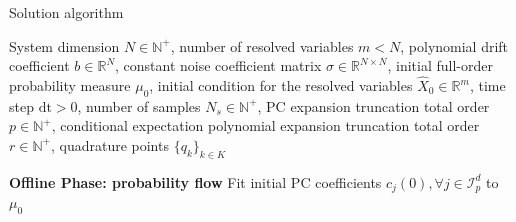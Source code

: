 \documentclass[11pt, a4paper, oneside, reqno]{amsart}
\makeatletter
\def\subsection{\@startsection{subsection}{2}%
	\z@{.5\linespacing\@plus.7\linespacing}{.5\linespacing}%
	{\normalfont\large\bfseries}}
\makeatother
\begin{document}
\subsection{Solution algorithm}
\begin{algorithm}[H]
\caption{Surrogate trajectories along probability flows}
\label{alg:solution algo}
\begin{algorithmic}[1]
\Require System dimension $N\in\mathbb{N}^+$, number of resolved variables $m<N$, polynomial drift coefficient $b\in\mathbb{R}^N$, constant noise coefficient matrix $\sigma\in\mathbb{R}^{N\times N}$, initial full-order probability measure $\mu_0$, initial condition for the resolved variables $\hat{X}_0\in \mathbb{R}^m$, time step $\mathrm{dt}>0$, number of samples $N_s\in\mathbb{N}^+$, PC expansion truncation total order $p\in\mathbb{N}^+$, conditional expectation polynomial expansion truncation total order $r\in\mathbb{N}^+$, quadrature points $\{q_k\}_{k\in K}$

\Statex %

\Statex \textbf{Offline Phase: probability flow}
\State Fit initial PC coefficients $c_j(0), \forall j\in \mathcal{I}_p^d$ to $\mu_0$


\end{algorithmic}
\end{algorithm}
\end{document}
